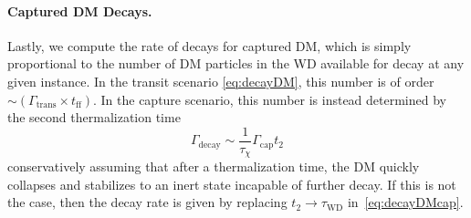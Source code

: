 \paragraph{Captured DM Decays.}
Lastly, we compute the rate of decays for captured DM, which is simply proportional to the number of DM particles in the WD available for decay at any given instance.  
In the transit scenario \eqref{eq:decayDM}, this number is of order $\sim (\Gamma_\text{trans} \times t_\text{ff})$.  
In the capture scenario, this number is instead determined by the second thermalization time
\begin{equation}
\Gamma_\text{decay} \sim  \frac{1}{\tau_\chi} \Gamma_\text{cap} t_2
\label{eq:decayDMcap}
\end{equation}
conservatively assuming that after a thermalization time, the DM quickly collapses and stabilizes to an inert state incapable of further decay.
If this is not the case, then the decay rate is given by replacing $t_2 \to \tau_\text{WD}$ in~\eqref{eq:decayDMcap}.

